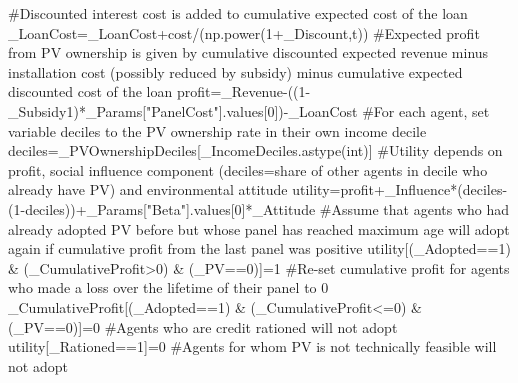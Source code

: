 \documentclass[
  letterpaper,
  DIV=11,
  numbers=noendperiod]{scrartcl}
\newenvironment{Shaded}{\begin{snugshade}}{\end{snugshade}}
\newcommand{\BuiltInTok}[1]{\textcolor[rgb]{0.00,0.23,0.31}{#1}}
\newcommand{\CommentTok}[1]{\textcolor[rgb]{0.37,0.37,0.37}{#1}}
\newcommand{\DecValTok}[1]{\textcolor[rgb]{0.68,0.00,0.00}{#1}}
\newcommand{\NormalTok}[1]{\textcolor[rgb]{0.00,0.23,0.31}{#1}}
\newcommand{\OperatorTok}[1]{\textcolor[rgb]{0.37,0.37,0.37}{#1}}
\newcommand{\StringTok}[1]{\textcolor[rgb]{0.13,0.47,0.30}{#1}}
\begin{document}
\begin{Shaded}
\begin{Highlighting}[]
        \CommentTok{\#Discounted interest cost is added to cumulative expected cost of the loan}
\NormalTok{        \_LoanCost}\OperatorTok{=}\NormalTok{\_LoanCost}\OperatorTok{+}\NormalTok{cost}\OperatorTok{/}\NormalTok{(np.power(}\DecValTok{1}\OperatorTok{+}\NormalTok{\_Discount,t))}
    \CommentTok{\#Expected profit from PV ownership is given by cumulative discounted expected revenue minus installation cost (possibly reduced by subsidy) minus cumulative expected discounted cost of the loan}
\NormalTok{    profit}\OperatorTok{=}\NormalTok{\_Revenue}\OperatorTok{{-}}\NormalTok{((}\DecValTok{1}\OperatorTok{{-}}\NormalTok{\_Subsidy1)}\OperatorTok{*}\NormalTok{\_Params[}\StringTok{"PanelCost"}\NormalTok{].values[}\DecValTok{0}\NormalTok{])}\OperatorTok{{-}}\NormalTok{\_LoanCost}
    \CommentTok{\#For each agent, set variable deciles to the PV ownership rate in their own income decile}
\NormalTok{    deciles}\OperatorTok{=}\NormalTok{\_PVOwnershipDeciles[\_IncomeDeciles.astype(}\BuiltInTok{int}\NormalTok{)]}
    \CommentTok{\#Utility depends on profit, social influence component (deciles=share of other agents in decile who already have PV) and environmental attitude}
\NormalTok{    utility}\OperatorTok{=}\NormalTok{profit}\OperatorTok{+}\NormalTok{\_Influence}\OperatorTok{*}\NormalTok{(deciles}\OperatorTok{{-}}\NormalTok{(}\DecValTok{1}\OperatorTok{{-}}\NormalTok{deciles))}\OperatorTok{+}\NormalTok{\_Params[}\StringTok{"Beta"}\NormalTok{].values[}\DecValTok{0}\NormalTok{]}\OperatorTok{*}\NormalTok{\_Attitude}
    \CommentTok{\#Assume that agents who had already adopted PV before but whose panel has reached maximum age will adopt again if cumulative profit from the last panel was positive}
\NormalTok{    utility[(\_Adopted}\OperatorTok{==}\DecValTok{1}\NormalTok{) }\OperatorTok{\&}\NormalTok{ (\_CumulativeProfit}\OperatorTok{\textgreater{}}\DecValTok{0}\NormalTok{) }\OperatorTok{\&}\NormalTok{ (\_PV}\OperatorTok{==}\DecValTok{0}\NormalTok{)]}\OperatorTok{=}\DecValTok{1}
    \CommentTok{\#Re{-}set cumulative profit for agents who made a loss over the lifetime of their panel to 0}
\NormalTok{    \_CumulativeProfit[(\_Adopted}\OperatorTok{==}\DecValTok{1}\NormalTok{) }\OperatorTok{\&}\NormalTok{ (\_CumulativeProfit}\OperatorTok{\textless{}=}\DecValTok{0}\NormalTok{) }\OperatorTok{\&}\NormalTok{ (\_PV}\OperatorTok{==}\DecValTok{0}\NormalTok{)]}\OperatorTok{=}\DecValTok{0}
    \CommentTok{\#Agents who are credit rationed will not adopt}
\NormalTok{    utility[\_Rationed}\OperatorTok{==}\DecValTok{1}\NormalTok{]}\OperatorTok{=}\DecValTok{0}
    \CommentTok{\#Agents for whom PV is not technically feasible will not adopt}

\end{Highlighting}
\end{Shaded}
\end{document}
